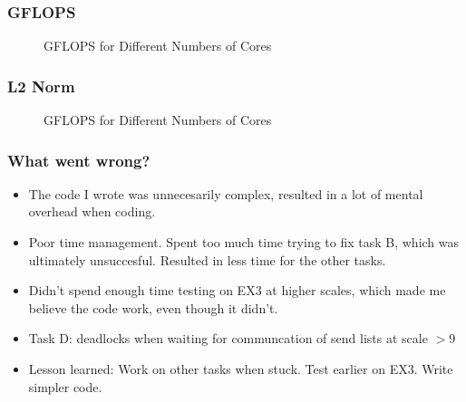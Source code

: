 \documentclass{beamer}
\begin{document}
\begin{frame}
\frametitle{GFLOPS}
\begin{figure}
\centering
{}
\caption{GFLOPS for Different Numbers of Cores}
\end{figure}
\end{frame}
\begin{frame}
\frametitle{L2 Norm}
\begin{figure}
\centering
{}
\caption{GFLOPS for Different Numbers of Cores}
\end{figure}
\end{frame}

\begin{frame}
    \frametitle{What went wrong?}

    \begin{itemize}
        \item The code I wrote was unnecesarily complex, resulted in a lot of mental overhead when coding. 
        \item Poor time management. Spent too much time trying to fix task B, which was ultimately unsuccesful. Resulted in less time for the other tasks.
        \item Didn't spend enough time testing on EX3 at higher scales, which made me believe the code work, even though it didn't.
        \item Task D: deadlocks when waiting for communcation of send lists at scale \( > 9 \)
        \item Lesson learned: Work on other tasks when stuck. Test earlier on EX3. Write simpler code.
    \end{itemize}
\end{frame}
\end{document}
